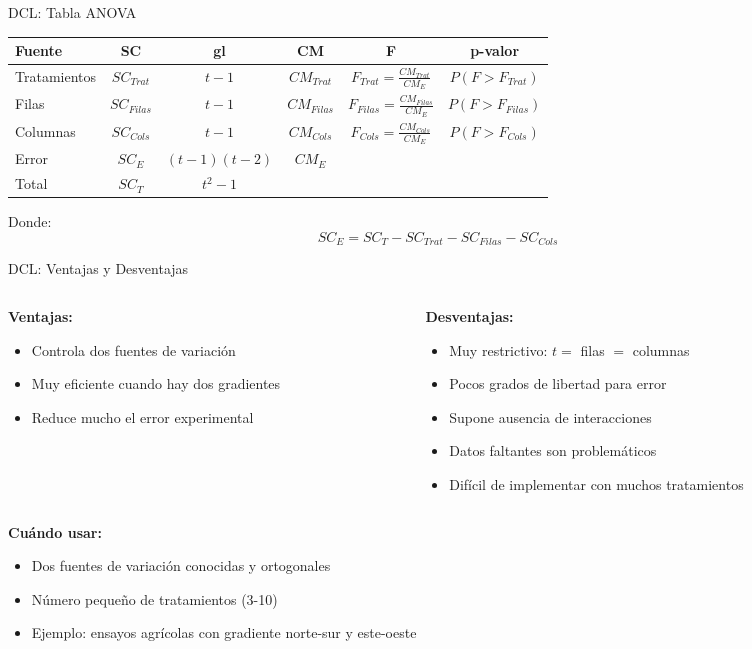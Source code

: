 \documentclass[aspectratio=169]{beamer}
\begin{document}
\begin{frame}{DCL: Tabla ANOVA}
\begin{table}
\centering
\small
\begin{tabular}{lccccc}
\toprule
\textbf{Fuente} & \textbf{SC} & \textbf{gl} & \textbf{CM} & \textbf{F} & \textbf{p-valor} \\
\midrule
Tratamientos & $SC_{Trat}$ & $t-1$ & $CM_{Trat}$ & $F_{Trat} = \frac{CM_{Trat}}{CM_E}$ & $P(F > F_{Trat})$ \\[0.2cm]
Filas & $SC_{Filas}$ & $t-1$ & $CM_{Filas}$ & $F_{Filas} = \frac{CM_{Filas}}{CM_E}$ & $P(F > F_{Filas})$ \\[0.2cm]
Columnas & $SC_{Cols}$ & $t-1$ & $CM_{Cols}$ & $F_{Cols} = \frac{CM_{Cols}}{CM_E}$ & $P(F > F_{Cols})$ \\[0.2cm]
Error & $SC_E$ & $(t-1)(t-2)$ & $CM_E$ & & \\[0.2cm]
\midrule
Total & $SC_T$ & $t^2-1$ & & & \\
\bottomrule
\end{tabular}
\end{table}

\vspace{0.3cm}
Donde:
$$SC_E = SC_T - SC_{Trat} - SC_{Filas} - SC_{Cols}$$
\end{frame}

\begin{frame}{DCL: Ventajas y Desventajas}
\begin{columns}
\begin{column}{0.5\textwidth}
\textbf{Ventajas:}
\begin{itemize}
\item Controla dos fuentes de variación
\item Muy eficiente cuando hay dos gradientes
\item Reduce mucho el error experimental
\end{itemize}
\end{column}
\begin{column}{0.5\textwidth}
\textbf{Desventajas:}
\begin{itemize}
\item Muy restrictivo: $t = $ filas $=$ columnas
\item Pocos grados de libertad para error
\item Supone ausencia de interacciones
\item Datos faltantes son problemáticos
\item Difícil de implementar con muchos tratamientos
\end{itemize}
\end{column}
\end{columns}

\vspace{0.4cm}
\textbf{Cuándo usar:}
\begin{itemize}
\item Dos fuentes de variación conocidas y ortogonales
\item Número pequeño de tratamientos (3-10)
\item Ejemplo: ensayos agrícolas con gradiente norte-sur y este-oeste
\end{itemize}
\end{frame}
\end{document}
